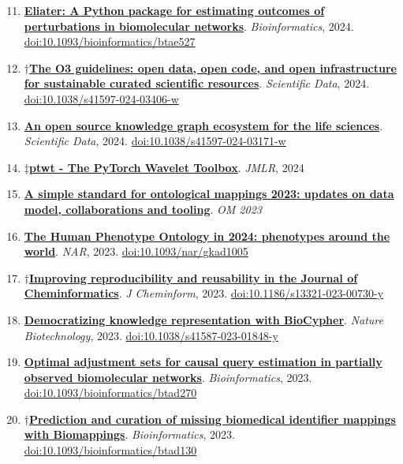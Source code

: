\documentclass[10pt,a4paper,sans]{moderncv} %
\newcommand{\wikidata}[2]{\href{https://bioregistry.io/wikidata:#1?provider=scholia}{{#2}}}
\begin{document}
    \begin{enumerate}
    \setcounter{enumi}{10}
    \itemsep0.5em
        \item
        \wikidata{Q130227212}{\textbf{Eliater: A Python package for estimating outcomes of perturbations in biomolecular networks}}.
    \textit{Bioinformatics}, 2024.  {\scriptsize \href{https://bioregistry.io/doi:10.1093/BIOINFORMATICS/BTAE527}{doi:10.1093/bioinformatics/btae527}}
        \item
        $\dagger$\wikidata{Q126325456}{\textbf{The O3 guidelines: open data, open code, and open infrastructure for sustainable curated scientific resources}}.
    \textit{Scientific Data}, 2024.  {\scriptsize \href{https://bioregistry.io/doi:10.1038/S41597-024-03406-W}{doi:10.1038/s41597-024-03406-w}}
        \item
        \wikidata{Q125554573}{\textbf{An open source knowledge graph ecosystem for the life sciences}}.
    \textit{Scientific Data}, 2024.  {\scriptsize \href{https://bioregistry.io/doi:10.1038/S41597-024-03171-W}{doi:10.1038/s41597-024-03171-w}}
        \item
        $\ddagger$\wikidata{Q126325520}{\textbf{ptwt - The PyTorch Wavelet Toolbox}}.
    \textit{JMLR}, 2024
    \end{enumerate}
    \begin{enumerate}
    \setcounter{enumi}{14}
    \itemsep0.5em
        \item
        \wikidata{Q125846652}{\textbf{A simple standard for ontological mappings 2023: updates on data model, collaborations and tooling}}.
    \textit{OM 2023}
        \item
        \wikidata{Q123608235}{\textbf{The Human Phenotype Ontology in 2024: phenotypes around the world}}.
    \textit{NAR}, 2023.  {\scriptsize \href{https://bioregistry.io/doi:10.1093/NAR/GKAD1005}{doi:10.1093/nar/gkad1005}}
        \item
        $\dagger$\wikidata{Q120200936}{\textbf{Improving reproducibility and reusability in the Journal of Cheminformatics}}.
    \textit{J Cheminform}, 2023.  {\scriptsize \href{https://bioregistry.io/doi:10.1186/S13321-023-00730-Y}{doi:10.1186/s13321-023-00730-y}}
        \item
        \wikidata{Q119813997}{\textbf{Democratizing knowledge representation with BioCypher}}.
    \textit{Nature Biotechnology}, 2023.  {\scriptsize \href{https://bioregistry.io/doi:10.1038/S41587-023-01848-Y}{doi:10.1038/s41587-023-01848-y}}
        \item
        \wikidata{Q122028693}{\textbf{Optimal adjustment sets for causal query estimation in partially observed biomolecular networks}}.
    \textit{Bioinformatics}, 2023.  {\scriptsize \href{https://bioregistry.io/doi:10.1093/BIOINFORMATICS/BTAD270}{doi:10.1093/bioinformatics/btad270}}
        \item
        $\dagger$\wikidata{Q118774152}{\textbf{Prediction and curation of missing biomedical identifier mappings with Biomappings}}.
    \textit{Bioinformatics}, 2023.  {\scriptsize \href{https://bioregistry.io/doi:10.1093/BIOINFORMATICS/BTAD130}{doi:10.1093/bioinformatics/btad130}}
    \end{enumerate}
\end{document}
